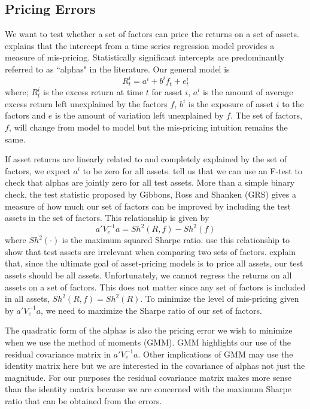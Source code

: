 
\subsection{Pricing Errors}

We want to test whether a set of factors can price the returns on a set of
assets.
\textcite{jensen1968performance} explains that the intercept from a time
series regression model provides a measure of mis-pricing.
Statistically significant intercepts are predominantly referred to as ``alphas"
in the literature. 
Our general model is
\begin{equation}
  \label{eq:gen_reg_model}
  R_t^i = a^i + b^if_t + e_t^i
\end{equation}
where;
$R_t^i$ is the excess return at time $t$ for asset $i$,
$a^i$ is the amount of average excess return left unexplained by the factors $f$,
$b^i$ is the exposure of asset $i$ to the factors and
$e$ is the amount of variation left unexplained by $f$.
The set of factors, $f$, will change from model to model but the mis-pricing
intuition remains the same.

If asset returns are linearly related to and completely explained by the set of factors, we 
expect $a^i$ to be zero for all assets.
\textcite{gibbons1989test} tell us that we can use an F-test to check that
alphas are jointly zero for all test assets.
More than a simple binary check, the test statistic proposed by Gibbons, Ross
and Shanken (GRS) gives a measure of how much our set of factors can be
improved by including the test assets in the set of factors.
This relationship is given by
\[
  a'V_e^{-1}a = Sh^2(R, f) - Sh^2(f)
\]
where $Sh^2(\cdot)$ is the maximum squared Sharpe ratio.
\textcite{barillas2016alpha} use this relationship to show that test assets are
irrelevant when comparing two sets of factors.
\textcite{fama2016choosing} explain that, since the ultimate goal of
asset-pricing models is to price all assets, our test assets should be all
assets.
Unfortunately, we cannot regress the returns on all assets on a set of factors.
This does not matter since any set of factors is included in all assets,
$Sh^2(R, f)=Sh^2(R)$.
To minimize the level of mis-pricing given by $a'V_e^{-1}a$, we need to
maximize the Sharpe ratio of our set of factors.

The quadratic form of the alphas is also the pricing error we wish to minimize when we use the 
method of moments (GMM).
GMM highlights our use of the residual covariance matrix in $a'V_e^{-1}a$.
Other implications of GMM may use the identity matrix here but we are interested in the 
covariance of alphas not just the magnitude.
For our purposes the residual covariance matrix makes more sense than the identity matrix 
because we are concerned with the maximum Sharpe ratio that can be obtained from the errors.

